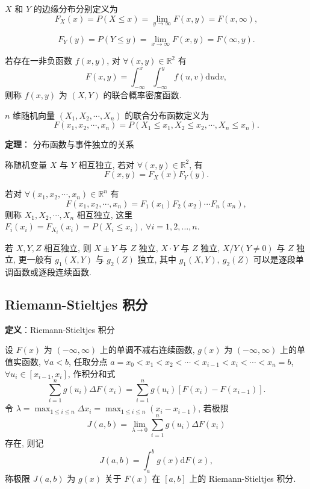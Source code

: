 \documentclass[openany]{ctexbook}
\theoremstyle{kaiti}
\theoremstyle{normal}
\begin{document}
$X$ 和 $Y$ 的边缘分布分别定义为 
\begin{equation}
  F_X(x)= P(X\leqslant x)= \lim_{y\to\infty} F(x, y)=F(x,\infty),
\end{equation} 

\begin{equation}
  F_Y(y)= P(Y\leqslant y)= \lim_{x\to\infty} F(x, y)=F(\infty,y).
\end{equation} 

若存在一非负函数 $f(x,y)$, 对 $\forall(x,y)\in\mathbb{R}^2$ 有
\begin{equation}
  F(x,y)=\int_{-\infty}^x\int_{-\infty}^yf(u,v)\mathrm{d}u\mathrm{d}v,
\end{equation}
 则称 $f(x,y)$ 为 $(X,Y)$ 的联合概率密度函数.

$n$ 维随机向量 $(X_1,X_2,\cdots,X_n)$ 的联合分布函数定义为
\begin{equation}
  F(x_1,x_2,\cdots,x_n)=P(X_1\leqslant x_1,X_2\leqslant x_2,\cdots,X_n\leqslant x_n).
\end{equation}


\textbf{定理}： 分布函数与事件独立的关系

称随机变量 $X$ 与 $Y$ 相互独立, 若对 $\forall(x,y)\in\mathbb{R}^2$, 有
\begin{equation}
  F(x, y)=F_X(x)F_Y(y).
\end{equation}


若对 $\forall(x_1,x_2,\cdots,x_n)\in\mathbb{R}^n$ 有
\begin{equation}
  F(x_1,x_2,\cdots,x_n)=F_1(x_1)F_2(x_2)\cdots F_n(x_n),
\end{equation}
 则称 $X_1,X_2,\cdots,X_n$ 相互独立, 这里 $F_i(x_i)=F_{X_i}(x_i)=P(X_i\leqslant x_i),~\forall i=1,2,\ldots,n$.

若 $X,Y,Z$ 相互独立, 则 $X\pm Y$ 与 $Z$ 独立, $X\cdot Y$ 与 $Z$ 独立, $X/Y(Y\neq0)$ 与 $Z$ 独立, 更一般有 $g_1(X,Y)$ 与 $g_2(Z)$ 独立, 其中 $g_1(X,Y),~g_2(Z)$ 可以是逐段单调函数或逐段连续函数.

\subsection{Riemann-Stieltjes 积分}

\textbf{定义}：Riemann-Stieltjes 积分

设 $F(x)$ 为 $(-\infty,\infty)$ 上的单调不减右连续函数, $g(x)$ 为 $(-\infty,\infty)$ 上的单值实函数, $\forall a<b$, 任取分点 $a=x_0<x_1<x_2<\cdots<x_{i-1}<x_i<\cdots<x_n=b$, $\forall u_i\in[x_{i-1},x_i]$, 作积分和式
\begin{equation}
  \sum_{i=1}^ng(u_i)\Delta F(x_i)=\sum_{i=1}^ng(u_i)[F(x_i)-F(x_{i-1})].
\end{equation}
 令 $\lambda=\max_{1\leqslant i\leqslant n}\Delta x_i=\max_{1\leqslant i\leqslant n}(x_i-x_{i-1})$, 若极限
\begin{equation}
  J(a,b)=\lim_{\lambda\to0}\sum_{i=1}^ng(u_i)\Delta F(x_i)
\end{equation}
 存在, 则记
\begin{equation}
  J(a,b)=\int_a^bg(x)\mathrm{d}F(x),
\end{equation}
 称极限 $J(a,b)$ 为 $g(x)$ 关于 $F(x)$ 在 $[a,b]$ 上的 Riemann-Stieltjes 积分.
\end{document}
